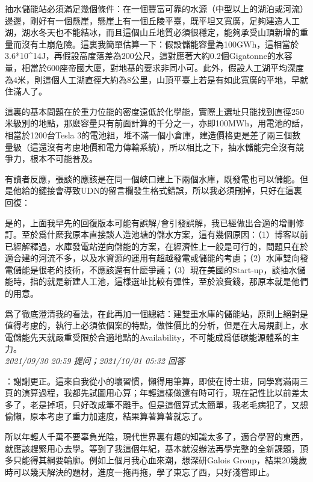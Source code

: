 \documentclass[twocolumn]{ctexart}
\begin{document}
抽水儲能站必須滿足幾個條件：在一個豐富可靠的水源（中型以上的湖泊或河流）邊邊，剛好有一個懸崖，懸崖上有一個丘陵平臺，既平坦又寬廣，足夠建造人工湖，湖水冬天也不能結冰，而且這個山丘地質必須很穩定，能夠承受山頂新增的重量而沒有土崩危險。這裏我簡單估算一下：假設儲能容量為100GWh，這相當於3.6*10\^{}14J，再假設高度落差為200公尺，這對應著大約0.2個Gigatonne的水容量，相當於600座帝國大廈，對地基的要求非同小可。此外，假設人工湖平均深度為4米，則這個人工湖直徑大約為8公里，山頂平臺上若是有如此寬廣的平地，早就住滿人了。

這裏的基本問題在於重力位能的密度遠低於化學能，實際上選址只能找到直徑250米級別的地點，那麽容量只有前面計算的千分之一，亦即100MWh，用電池的話，相當於1200台Tesla 3的電池組，堆不滿一個小倉庫，建造價格更是差了兩三個數量級（這還沒有考慮地價和電力傳輸系統），所以相比之下，抽水儲能完全沒有競爭力，根本不可能普及。


有讀者反應，張談的應該是在同一個峽口建上下兩個水庫，既發電也可以儲能。但是他給的鏈接會導致UDN的留言欄發生格式錯誤，所以我必須刪掉，只好在這裏回復：

是的，上面我早先的回復版本可能有誤解/會引發誤解，我已經做出合適的增刪修訂。至於爲什麽我原本直接談人造池塘的儲水方案，這有幾個原因：（1）博客以前已經解釋過，水庫發電站逆向儲能的方案，在經濟性上一般是可行的，問題只在於適合建的河流不多，以及水資源的運用有超越發電或儲能的考慮；（2）水庫雙向發電儲能是很老的技術，不應該還有什麽爭議；（3）現在美國的Start-up，談抽水儲能時，指的就是新建人工池，這樣選址比較有彈性，至於浪費錢，那原本就是他們的用意。


爲了徹底澄清我的看法，在此再加一個總結：建雙重水庫的儲能站，原則上絕對是值得考慮的，執行上必須依個案的特點，做性價比的分析，但是在大局規劃上，水電儲能先天就嚴重受限於合適地點的Availability，不可能成爲低碳能源體系的主力。
\\

\textit{\hfill\noindent\small 2021/09/30 20:59 提问；2021/10/01 05:32 回答}

：謝謝更正。這來自我從小的壞習慣，懶得用筆算，即使在博士班，同學寫滿兩三頁的演算過程，我都先試圖用心算；年輕這樣做還有時可行，現在記性比以前差太多了，老是掉項，只好改成筆不離手。但是這個算式太簡單，我老毛病犯了，又想偷懶，原本考慮了重力加速度，結果算著算著就忘了。

所以年輕人千萬不要辜負光陰，現代世界裏有趣的知識太多了，適合學習的東西，就應該趕緊用心去學。等到了我這個年紀，基本就沒辦法再學完整的全新課題，頂多只能得其綱要輪廓。例如上個月我心血來潮，想深研Galois Group，結果20幾歲時可以幾天解決的題材，進度一拖再拖，學了東忘了西，只好淺嘗即止。
\\
\end{document}
